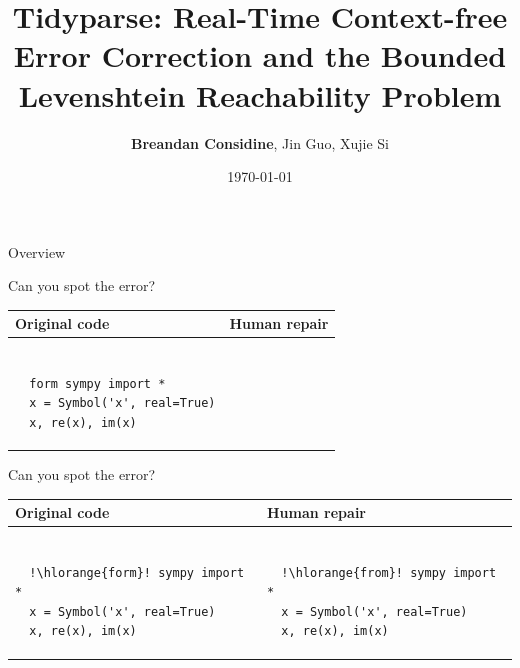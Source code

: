 \documentclass{beamer}
\title[Tidyparse: Real-Time Context-free Error Correction]{Tidyparse: Real-Time Context-free Error Correction and the Bounded Levenshtein Reachability Problem}
\author[Considine, Guo, Si]{\textbf{Breandan Considine}, Jin Guo, Xujie Si}
\institute[McGill]{
  McGill University, Mila IQIA\\
  \medskip
  \textit{bre@ndan.co}
}
\date{\today}
\begin{document}
\begin{frame}
  \titlepage
\end{frame}

\begin{frame}{Overview}
  \tableofcontents
\end{frame}

\begin{frame}[fragile]{Can you spot the error?}
  \begin{center}
    \begin{tabular}{|m{5.5cm}|m{5.5cm}|}
      \hline \rule{0pt}{2.5ex}\textbf{Original code}\rule[-1ex]{0pt}{2ex} &  \rule{0pt}{2.5ex}\textbf{Human repair}\rule[-1ex]{0pt}{2ex} \\\hline
      \begin{lstlisting}[escapechar=!, basicstyle=\linespread{1.3}\ttfamily\footnotesize]

  form sympy import *
  x = Symbol('x', real=True)
  x, re(x), im(x)

      \end{lstlisting} & \begin{lstlisting}[escapechar=!, basicstyle=\linespread{1.3}\ttfamily\footnotesize]

      \end{lstlisting} \\\hline
    \end{tabular}
  \end{center}
\end{frame}

\begin{frame}[fragile]{Can you spot the error?}
  \begin{center}
    \begin{tabular}{|m{5.5cm}|m{5.5cm}|}
      \hline \rule{0pt}{2.5ex}\textbf{Original code}\rule[-1ex]{0pt}{2ex} &  \rule{0pt}{2.5ex}\textbf{Human repair}\rule[-1ex]{0pt}{2ex} \\\hline
      \begin{lstlisting}[escapechar=!, basicstyle=\linespread{1.3}\ttfamily\footnotesize]

  !\hlorange{form}! sympy import *
  x = Symbol('x', real=True)
  x, re(x), im(x)

      \end{lstlisting} & \begin{lstlisting}[escapechar=!, basicstyle=\linespread{1.3}\ttfamily\footnotesize]

  !\hlorange{from}! sympy import *
  x = Symbol('x', real=True)
  x, re(x), im(x)

      \end{lstlisting} \\\hline
    \end{tabular}
  \end{center}
\end{frame}
\end{document}
